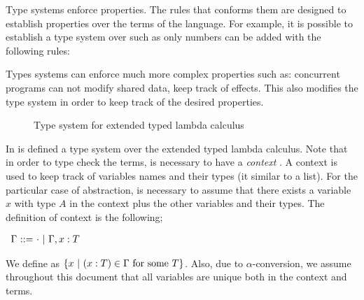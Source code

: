 Type systems enforce properties. The rules that conforms them are designed to establish properties 
over the terms of the language. For example, it is possible to establish a type system over 
\extTlambdaCalc{} such as only numbers can be added with the following rules:
Types systems can enforce much more complex properties such as: concurrent programs can not modify shared 
data, keep track of effects. This also modifies the type system in order to keep track of the desired properties.

\begin{figure}
    \caption{Type system for extended typed lambda calculus}
    \label{fig:extTypSysTypCalc}
\end{figure}

In  is defined a type system over the extended typed lambda calculus. Note 
that in order to type check the terms, is necessary to have a \emph{context} \Context{}. 
A context \Context{} is used to keep track of variables names and their types (it similar to a list).
For the particular case of 
abstraction, is necessary to assume that there exists a variable 
$x$ with type $A$ in the context plus the other variables and their types.
The definition of context is the following;
\begin{center}
$\begin{array}{r@{\ }c@{\ }l} \Context &::=&\EContext\ |\ \Context,x:T\end{array}$    
\end{center}
We define \domContext{\Context} as $\{x\ |\ (\typing{x}{T})\in\Context\text{ for some }T\}$. Also, due to 
$\alpha$-conversion, we assume throughout this document that all variables are unique both 
in the context and terms.

